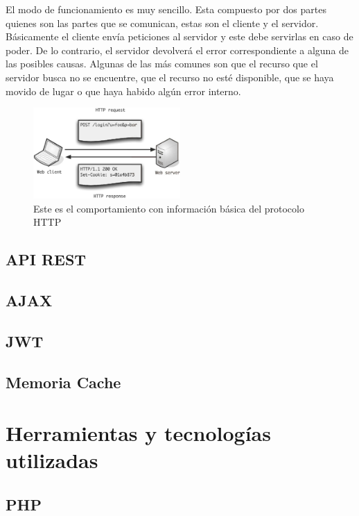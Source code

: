 El modo de funcionamiento es muy sencillo. Esta compuesto por dos partes quienes son 
las partes que se comunican, estas son el cliente y el servidor. Básicamente el cliente
envía peticiones al servidor y este debe servirlas en caso de poder. De lo contrario, 
el servidor devolverá el error correspondiente a alguna de las posibles causas. Algunas 
de las más comunes son que el recurso que el servidor busca no se encuentre, que el 
recurso no esté disponible, que se haya movido de lugar o que haya habido algún error 
interno.

\begin{figure}[htbp!] 
\centering    
\includegraphics[width=0.5\textwidth]{http1}
\caption[HTTP]{Este es el comportamiento con información básica del protocolo HTTP}
\label{fig:http-behavior}
\end{figure}


\subsection{API REST}

\subsection{AJAX}

\subsection{JWT}

\subsection{Memoria Cache}


\section{Herramientas y tecnologías utilizadas}

\subsection{PHP}

